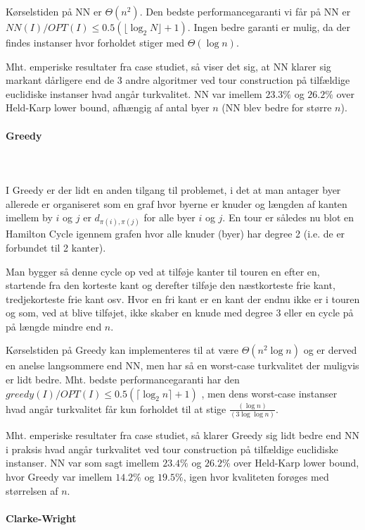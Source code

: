 Kørselstiden på NN er $\Theta(n^2)$. Den bedste performancegaranti vi får på NN er $NN(I)/OPT(I) \leq 0.5(\lfloor \log_2 N \rfloor + 1)$. Ingen bedre garanti er mulig, da der findes instanser hvor forholdet stiger med $\Theta(\log n)$.

Mht. emperiske resultater fra case studiet, så viser det sig, at NN klarer sig markant dårligere end de 3 andre algoritmer ved tour construction på tilfældige euclidiske instanser hvad angår turkvalitet. NN var imellem $23.3\%$ og $26.2\%$ over Held-Karp lower bound, afhængig af antal byer $n$ (NN blev bedre for større $n$).

\paragraph{Greedy}
~\\
~\\
I Greedy er der lidt en anden tilgang til problemet, i det at man antager byer allerede er organiseret som en graf hvor byerne er knuder og længden af kanten imellem by $i$ og $j$ er $d_{\pi(i),\pi(j)}$ for alle byer $i$ og $j$. En tour er således nu blot en Hamilton Cycle igennem grafen hvor alle knuder (byer) har degree 2 (i.e. de er forbundet til 2 kanter).

Man bygger så denne cycle op ved at tilføje kanter til touren en efter en, startende fra den korteste kant og derefter tilføje den næstkorteste frie kant, tredjekorteste frie kant osv. Hvor en fri kant er en kant der endnu ikke er i touren og som, ved at blive tilføjet, ikke skaber en knude med degree 3 eller en cycle på på længde mindre end $n$.

Kørselstiden på Greedy kan implementeres til at være $\Theta(n^2 \log n)$ og er derved en anelse langsommere end NN, men har så en worst-case turkvalitet der muligvis er lidt bedre. Mht. bedste performancegaranti har den $greedy(I)/OPT(I) \leq 0.5(\lceil \log_2 n \rceil + 1)$ , men dens worst-case instanser hvad angår turkvalitet får kun forholdet til at stige $\frac{(\log n)}{(3 \log \log n)}$.

Mht. emperiske resultater fra case studiet, så klarer Greedy sig lidt bedre end NN i praksis hvad angår turkvalitet ved tour construction på tilfældige euclidiske instanser. NN var som sagt imellem $23.4\%$ og $26.2\%$ over Held-Karp lower bound, hvor Greedy var imellem $14.2\%$ og $19.5\%$, igen hvor kvaliteten forøges med størrelsen af $n$.

\paragraph{Clarke-Wright}
~\\
~\\

